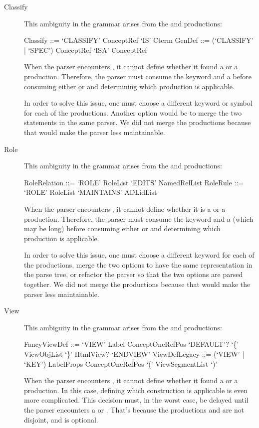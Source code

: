 \begin{description}
  \item[Classify]
    This ambiguity in the grammar arises from the  and  productions:
    \begin{ebnf}
     Classify ::= `CLASSIFY' ConceptRef `IS' Cterm
     GenDef ::= (`CLASSIFY' | `SPEC') ConceptRef `ISA' ConceptRef\end{ebnf}
    When the parser encounters , it cannot define whether it found a  or a  production.
    Therefore, the parser must consume the keyword and a  before consuming either  or  and determining which production is applicable.
    
    In order to solve this issue, one must choose a different keyword or symbol for each of the productions.
    Another option would be to merge the two statements in the same parser.
    We did not merge the productions because that would make the parser less maintainable.
  
  \item[Role]
    This ambiguity in the grammar arises from the  and  productions:
    \begin{ebnf}
     RoleRelation ::= `ROLE' RoleList `EDITS' NamedRelList
     RoleRule ::= `ROLE' RoleList `MAINTAINS' ADLidList\end{ebnf}
    When the parser encounters , it cannot define whether it is a  or a  production.
    Therefore, the parser must consume the keyword and a  (which may be long) before consuming either  or  and determining which production is applicable.
    
    In order to solve this issue, one must choose a different keyword for each of the productions, merge the two options to have the same representation in the parse tree, or refactor the parser so that the two options are parsed together.
    We did not merge the productions because that would make the parser less maintainable.
  
  \item[View]
    This ambiguity in the grammar arises from the  and  productions:
    \begin{ebnf}
     FancyViewDef ::= `VIEW' Label ConceptOneRefPos `DEFAULT'? `\{' ViewObjList `\}' HtmlView? `ENDVIEW'
     ViewDefLegacy ::= (`VIEW' | `KEY') LabelProps ConceptOneRefPos `(' ViewSegmentList `)'\end{ebnf}
    When the parser encounters , it cannot define whether it found a  or a  production.
    In this case, defining which construction is applicable is even more complicated.
    This decision must, in the worst case, be delayed until the parser encounters a  or .
    That's because the productions  and  are not disjoint, and  is optional.
    

\end{description}
